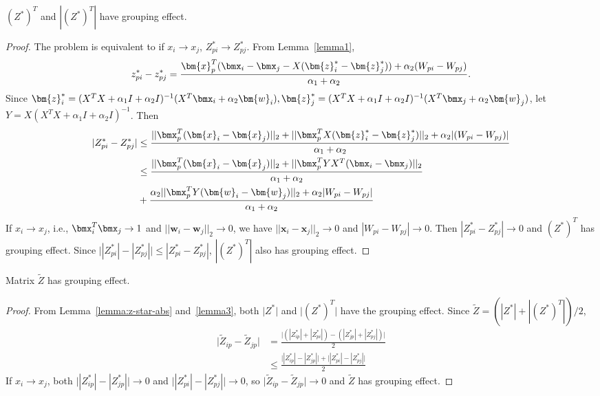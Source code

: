 \begin{lemma}
\label{lemma3}
$(Z^*)^T$ and $|(Z^*)^T|$ have grouping effect. 
\begin{proof}
The problem is equivalent to if $x_i \rightarrow x_j$, $Z^*_{pi} \rightarrow Z^*_{pj}$.
From Lemma~\ref{lemma1},
\begin{equation}
\nonumber
z_{pi}^*-z_{pj}^* = \frac{\bm{x}_p^T ( \bmx_i - \bmx_j - X(\bm{z}_i^*-\bm{z}_j^*)) + \alpha_2 (W_{pi}-W_{pj})}{\alpha_1+\alpha_2}.
\end{equation}
Since $\bm{z}_i^* = (X^TX + \alpha_1I + \alpha_2I)^{-1}(X^T\bmx_i+\alpha_2\bm{w}_i),\bm{z}_j^* = (X^TX + \alpha_1I + \alpha_2I)^{-1}(X^T\bmx_j+\alpha_2\bm{w}_j)$,
let $Y = X(X^TX + \alpha_1I + \alpha_2I)^{-1}$. Then
\begin{equation}
\begin{split}
|Z_{pi}^*-Z_{pj}^*| & \leq \frac{||\bmx_p^T(\bm{x}_i - \bm{x}_j)||_2 + ||\bmx_p^TX(\bm{z}_i^*-\bm{z}_j^*)||_2 + \alpha_2 |(W_{pi}-W_{pj})|}{\alpha_1+\alpha_2}\\
& \leq \frac{||\bmx_p^T(\bm{x}_i - \bm{x}_j)||_2 + ||\bmx_p^TYX^T(\bmx_i-\bmx_j)||_2}{\alpha_1+\alpha_2}\\
& + \frac{\alpha_2||\bmx_p^TY(\bm{w}_i - \bm{w}_j)||_2 + \alpha_2 |W_{pi}-W_{pj}|}{\alpha_1+\alpha_2}\\
\end{split}
\end{equation}
If $x_i \rightarrow x_j$, i.e., $\bmx_i^T\bmx_j \rightarrow 1$ and $||\bm{w}_i - \bm{w}_j||_2 \rightarrow 0$, 
we have
$||\bm{x}_i - \bm{x}_j||_2 \rightarrow 0$ and $|W_{pi}-W_{pj}| \rightarrow 0$.
Then $|Z_{pi}^*-Z_{pj}^*| \rightarrow 0$ and
$(Z^*)^T$ has grouping effect.
Since $\bigl||Z_{pi}^*|-|Z_{pj}^*|\bigr| \leq |Z_{pi}^*-Z_{pj}^*|$, $|(Z^*)^T|$ also has grouping effect.
\end{proof}
\end{lemma}

\begin{lemma}
\label{lemma4}
Matrix $\tilde{Z}$ has grouping effect. 
\begin{proof}
From Lemma~\ref{lemma:z-star-abs} and~\ref{lemma3},
both $\lvert Z^*\rvert$ and $\lvert (Z^*)^T\rvert$ have the grouping effect.
Since $\tilde{Z} = (|Z^*|+|(Z^*)^T|)/2$,
\begin{equation}
\begin{split}
\lvert \tilde{Z}_{ip} - \tilde{Z}_{jp}\rvert & = \frac{\bigl| (|Z^*_{ip}|+|Z^*_{pi}|) - (|Z^*_{jp}|+|Z^*_{pj}|)\bigr|}{2} \\
& \leq \frac{\bigl||Z_{ip}^*|-|Z_{jp}^*|\bigr| + \bigl||Z_{pi}^*|-|Z_{pj}^*|\bigr|}{2}
\end{split}
\end{equation}
If $x_i \rightarrow x_j$,
both $\bigl||Z_{ip}^*|-|Z_{jp}^*|\bigr| \rightarrow 0$ and $\bigl||Z_{pi}^*|-|Z_{pj}^*|\bigr| \rightarrow 0$,
so $\lvert \tilde{Z}_{ip} - \tilde{Z}_{jp}\rvert \rightarrow 0$ and
$\tilde{Z}$ has grouping effect.
\end{proof}
\end{lemma}


